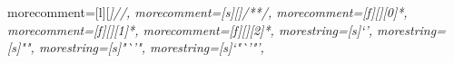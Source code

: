 {    %
    morecomment=[l][\itshape\color{gray}]{//},
    morecomment=[s][\color{gray}]{/*}{*/},
    morecomment=[f][\itshape\color{gray}][0]{*}, %
    morecomment=[f][\itshape\color{gray}][1]{*}, %
    morecomment=[f][\itshape\color{gray}][2]{*}, %
    morestring=[s]{`}{'},
    morestring=[s]{"}{"},
    morestring=[s]{"`}{'"},
    morestring=[s]{`"`}{'"'},
}